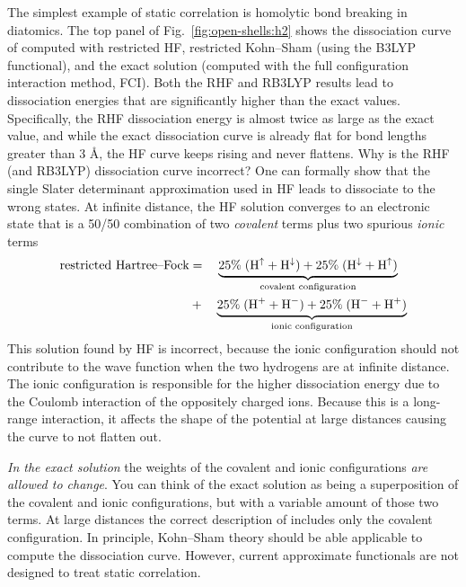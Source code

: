 \documentclass[../Main/notes.tex]{subfiles}
\begin{document}
The simplest example of static correlation is homolytic bond breaking in  diatomics.
The top panel of Fig.~\ref{fig:open-shells:h2} shows the dissociation curve of  computed with restricted HF, restricted Kohn--Sham (using the B3LYP functional), and the exact solution (computed with the full configuration interaction method, FCI).
Both the RHF and RB3LYP results lead to dissociation energies that are significantly higher than the exact values.
Specifically, the RHF dissociation energy is almost twice as large as the exact value, and while the exact dissociation curve is already flat for bond lengths greater than 3 \AA{}, the HF curve keeps rising and never flattens.
Why is the RHF (and RB3LYP) dissociation curve incorrect?
One can formally show that the single Slater determinant approximation used in HF leads  to dissociate to the wrong states.
At infinite distance, the HF solution converges to an electronic state that is a 50/50 combination of two \emph{covalent} terms plus two spurious \emph{ionic} terms
\begin{equation}
\begin{split}
\text{restricted Hartree--Fock} & = \quad \underbrace{25\% \; (\ce{H}^{\uparrow} + \ce{H}^{\downarrow}) + 25\% \; (\ce{H}^{\downarrow} + \ce{H}^{\uparrow})}_{\text{covalent configuration}} \\
& + \quad 
\underbrace{25\% \; (\ce{H+} + \ce{H-}) + 25\% \; (\ce{H-} + \ce{H+})}_{\text{ionic configuration}}
\end{split}
\end{equation}
This solution found by HF is incorrect, because the ionic configuration should not contribute to the wave function when the two hydrogens are at infinite distance.
The ionic configuration is responsible for the higher dissociation energy due to the Coulomb interaction of the oppositely charged ions.
Because this is a long-range interaction, it affects the shape of the potential at large distances causing the curve to not flatten out.

\emph{In the exact solution} the weights of the covalent and ionic configurations \emph{are allowed to change}.
You can think of the exact solution as being a superposition of the covalent and ionic configurations, but with a variable amount of those two terms. At  large  distances the correct description of  includes only the covalent configuration.
In principle, Kohn--Sham theory should be able applicable to compute the  dissociation curve. However, current approximate functionals are not designed to treat static correlation.
\end{document}
